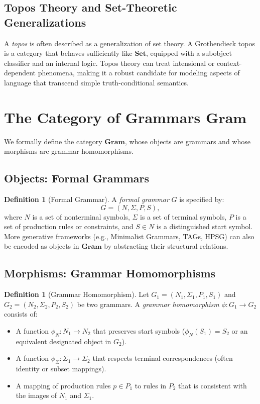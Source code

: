 \documentclass[12pt]{article}
\theoremstyle{plain}
\theoremstyle{definition}
\newtheorem{definition}[theorem]{Definition}
\begin{document}
\subsection{Topos Theory and Set-Theoretic Generalizations}
A \emph{topos} is often described as a generalization of set theory. A Grothendieck topos is a category that behaves sufficiently like \(\mathbf{Set}\), equipped with a subobject classifier and an internal logic. Topos theory can treat intensional or context-dependent phenomena, making it a robust candidate for modeling aspects of language that transcend simple truth-conditional semantics.

\section{The Category of Grammars \(\mathbf{Gram}\)}
We formally define the category \(\mathbf{Gram}\), whose objects are grammars and whose morphisms are grammar homomorphisms.

\subsection{Objects: Formal Grammars}
\begin{definition}[Formal Grammar]
A \emph{formal grammar} \(G\) is specified by:
\[
G = (N, \Sigma, P, S),
\]
where \(N\) is a set of nonterminal symbols, \(\Sigma\) is a set of terminal symbols, \(P\) is a set of production rules or constraints, and \(S \in N\) is a distinguished start symbol. More generative frameworks (e.g., Minimalist Grammars, TAGs, HPSG) can also be encoded as objects in \(\mathbf{Gram}\) by abstracting their structural relations.
\end{definition}

\subsection{Morphisms: Grammar Homomorphisms}
\begin{definition}[Grammar Homomorphism]
\label{def:grammar-homomorphism}
Let \(G_1 = (N_1, \Sigma_1, P_1, S_1)\) and \(G_2 = (N_2, \Sigma_2, P_2, S_2)\) be two grammars. A \emph{grammar homomorphism} \(\phi: G_1 \to G_2\) consists of:
\begin{itemize}
    \item A function \(\phi_N: N_1 \to N_2\) that preserves start symbols (\(\phi_N(S_1) = S_2\) or an equivalent designated object in \(G_2\)).
    \item A function \(\phi_\Sigma: \Sigma_1 \to \Sigma_2\) that respects terminal correspondences (often identity or subset mappings).
    \item A mapping of production rules \(p \in P_1\) to rules in \(P_2\) that is consistent with the images of \(N_1\) and \(\Sigma_1\).
\end{itemize}
\end{definition}
\end{document}

